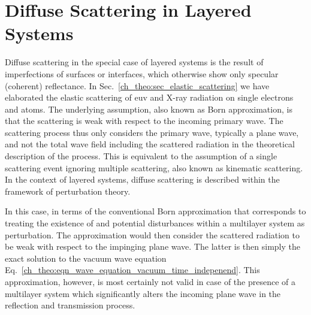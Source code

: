\section{Diffuse Scattering in Layered Systems}
Diffuse scattering in the special case of layered systems is the result of imperfections of surfaces or interfaces, which otherwise show only specular (coherent) reflectance. In Sec.~\ref{ch_theo:sec_elastic_scattering} we have elaborated the elastic scattering of \gls{euv} and X-ray radiation on single electrons and atoms. The underlying assumption, also known as Born approximation, is that the scattering is weak with respect to the incoming primary wave. The scattering process thus only considers the primary wave, typically a plane wave, and not the total wave field including the scattered radiation in the theoretical description of the process. This is equivalent to the assumption of a single scattering event ignoring multiple scattering, also known as kinematic scattering. In the context of layered systems, diffuse scattering is described within the framework of perturbation theory.

In this case, in terms of the conventional Born approximation that corresponds to treating the existence of and potential disturbances within a multilayer system as perturbation. The approximation would then consider the scattered radiation to be weak with respect to the impinging plane wave. The latter is then simply the exact solution to the vacuum wave equation Eq.~\eqref{ch_theo:eqn_wave_equation_vacuum_time_indepenend}. This approximation, however, is most certainly not valid in case of the presence of a multilayer system which significantly alters the incoming plane wave in the reflection and transmission process.


